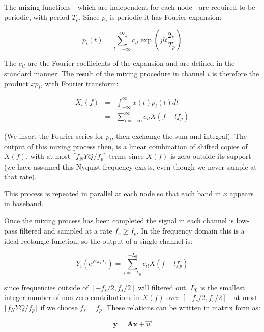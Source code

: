 \documentclass[conference]{IEEEtran}
\begin{document}
The mixing functions - which are independent for each node - are required to be periodic, with period \(T_p\). Since \(p_i\) is periodic it has Fourier expansion:

\begin{equation}
p_i\left(t\right) = \sum_{l=-\infty}^{\infty} c_{il} \exp\left({jlt\frac{2\pi}{T_p}}\right)
\end{equation}

The \(c_{il}\) are the Fourier coefficients of the expansion and are defined in the standard manner. The result of the mixing procedure in channel \(i\) is therefore the product \(xp_i\), with Fourier transform:

\begin{align}
X_{i}\left(f\right) &=& \int_{-\infty}^{\infty} x\left(t\right) p_i\left(t\right) dt
\\ &=& \sum_{l=-\infty}^{\infty} c_{il} X\left(f-lf_p\right)
\end{align}

(We insert the Fourier series for \(p_i\), then exchange the sum and integral). The output of this mixing process then, is a linear combination of shifted copies of \(X\left(f\right)\), with at most \(\lceil f_NYQ/f_p\rceil\) terms since \(X\left(f\right)\) is zero outside its support (we have assumed this Nyquist frequency exists, even though we never sample at that rate).

This process is repeated in parallel at each node so that each band in \(x\) appears in baseband.

Once the mixing process has been completed the signal in each channel is low-pass filtered and sampled at a rate \(f_s \geq f_p\). In the frequency domain this is a ideal rectangle function, so the output of a single channel is:

\begin{equation}
Y_i\left(e^{j 2 \pi f T_s }\right) = \sum_{l = -L_0}^{+L_0} c_{il} X\left(f-lf_p\right)
\end{equation}

since frequencies outside of \([-f_s/2, f_s/2]\) will filtered out. \(L_0\) is the smallest integer number of non-zero contributions in \(X\left(f\right)\) over \([-f_s/2, f_s/2]\) - at most \(\lceil f_NYQ/f_p\rceil\) if we choose \(f_s = f_p\). These relations can be written in matrix form as:

\begin{equation}
\textbf{y} = \textbf{A}\textbf{x} + \vec{w}
\label{system}
\end{equation}
\end{document}
